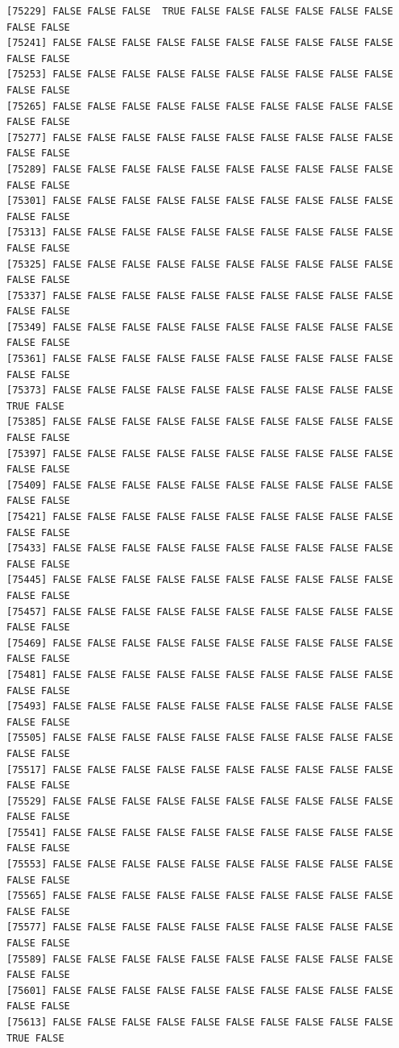 \documentclass[
  a4paper,
  DIV=11,
  numbers=noendperiod]{scrartcl}
\begin{document}
\begin{verbatim}
[75229] FALSE FALSE FALSE  TRUE FALSE FALSE FALSE FALSE FALSE FALSE FALSE FALSE
[75241] FALSE FALSE FALSE FALSE FALSE FALSE FALSE FALSE FALSE FALSE FALSE FALSE
[75253] FALSE FALSE FALSE FALSE FALSE FALSE FALSE FALSE FALSE FALSE FALSE FALSE
[75265] FALSE FALSE FALSE FALSE FALSE FALSE FALSE FALSE FALSE FALSE FALSE FALSE
[75277] FALSE FALSE FALSE FALSE FALSE FALSE FALSE FALSE FALSE FALSE FALSE FALSE
[75289] FALSE FALSE FALSE FALSE FALSE FALSE FALSE FALSE FALSE FALSE FALSE FALSE
[75301] FALSE FALSE FALSE FALSE FALSE FALSE FALSE FALSE FALSE FALSE FALSE FALSE
[75313] FALSE FALSE FALSE FALSE FALSE FALSE FALSE FALSE FALSE FALSE FALSE FALSE
[75325] FALSE FALSE FALSE FALSE FALSE FALSE FALSE FALSE FALSE FALSE FALSE FALSE
[75337] FALSE FALSE FALSE FALSE FALSE FALSE FALSE FALSE FALSE FALSE FALSE FALSE
[75349] FALSE FALSE FALSE FALSE FALSE FALSE FALSE FALSE FALSE FALSE FALSE FALSE
[75361] FALSE FALSE FALSE FALSE FALSE FALSE FALSE FALSE FALSE FALSE FALSE FALSE
[75373] FALSE FALSE FALSE FALSE FALSE FALSE FALSE FALSE FALSE FALSE  TRUE FALSE
[75385] FALSE FALSE FALSE FALSE FALSE FALSE FALSE FALSE FALSE FALSE FALSE FALSE
[75397] FALSE FALSE FALSE FALSE FALSE FALSE FALSE FALSE FALSE FALSE FALSE FALSE
[75409] FALSE FALSE FALSE FALSE FALSE FALSE FALSE FALSE FALSE FALSE FALSE FALSE
[75421] FALSE FALSE FALSE FALSE FALSE FALSE FALSE FALSE FALSE FALSE FALSE FALSE
[75433] FALSE FALSE FALSE FALSE FALSE FALSE FALSE FALSE FALSE FALSE FALSE FALSE
[75445] FALSE FALSE FALSE FALSE FALSE FALSE FALSE FALSE FALSE FALSE FALSE FALSE
[75457] FALSE FALSE FALSE FALSE FALSE FALSE FALSE FALSE FALSE FALSE FALSE FALSE
[75469] FALSE FALSE FALSE FALSE FALSE FALSE FALSE FALSE FALSE FALSE FALSE FALSE
[75481] FALSE FALSE FALSE FALSE FALSE FALSE FALSE FALSE FALSE FALSE FALSE FALSE
[75493] FALSE FALSE FALSE FALSE FALSE FALSE FALSE FALSE FALSE FALSE FALSE FALSE
[75505] FALSE FALSE FALSE FALSE FALSE FALSE FALSE FALSE FALSE FALSE FALSE FALSE
[75517] FALSE FALSE FALSE FALSE FALSE FALSE FALSE FALSE FALSE FALSE FALSE FALSE
[75529] FALSE FALSE FALSE FALSE FALSE FALSE FALSE FALSE FALSE FALSE FALSE FALSE
[75541] FALSE FALSE FALSE FALSE FALSE FALSE FALSE FALSE FALSE FALSE FALSE FALSE
[75553] FALSE FALSE FALSE FALSE FALSE FALSE FALSE FALSE FALSE FALSE FALSE FALSE
[75565] FALSE FALSE FALSE FALSE FALSE FALSE FALSE FALSE FALSE FALSE FALSE FALSE
[75577] FALSE FALSE FALSE FALSE FALSE FALSE FALSE FALSE FALSE FALSE FALSE FALSE
[75589] FALSE FALSE FALSE FALSE FALSE FALSE FALSE FALSE FALSE FALSE FALSE FALSE
[75601] FALSE FALSE FALSE FALSE FALSE FALSE FALSE FALSE FALSE FALSE FALSE FALSE
[75613] FALSE FALSE FALSE FALSE FALSE FALSE FALSE FALSE FALSE FALSE  TRUE FALSE

\end{verbatim}
\end{document}

